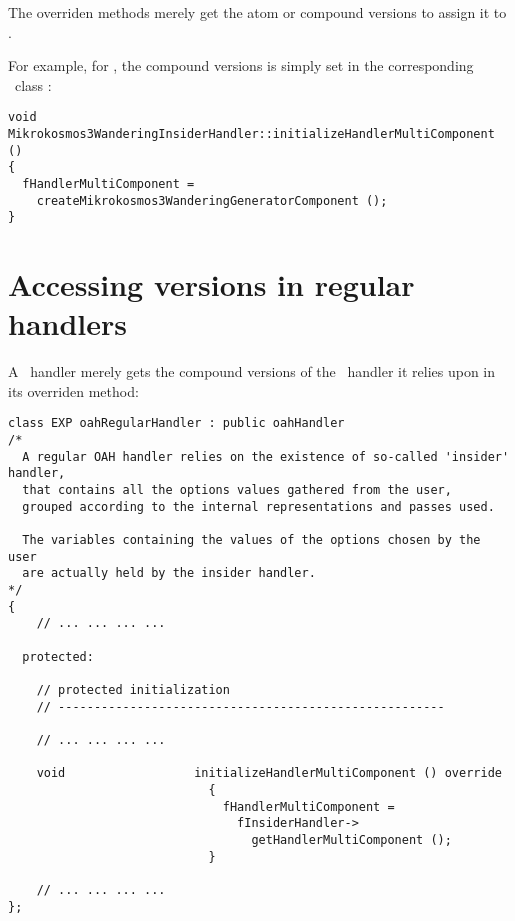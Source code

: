 The overriden  methods merely get the atom or compound versions to assign it to .

For example, for , the compound versions is simply set in the corresponding \insider\ class   :
\begin{lstlisting}[language=CPlusPlus]
void Mikrokosmos3WanderingInsiderHandler::initializeHandlerMultiComponent ()
{
  fHandlerMultiComponent =
    createMikrokosmos3WanderingGeneratorComponent ();
}
\end{lstlisting}


\section{Accessing versions in regular handlers}\label{Accessing versions in regular handlers}

A \regular\ handler merely gets the compound versions of the \insider\ handler it relies upon in its overriden  method:
\begin{lstlisting}[language=CPlusPlus]
class EXP oahRegularHandler : public oahHandler
/*
  A regular OAH handler relies on the existence of so-called 'insider' handler,
  that contains all the options values gathered from the user,
  grouped according to the internal representations and passes used.

  The variables containing the values of the options chosen by the user
  are actually held by the insider handler.
*/
{
	// ... ... ... ...

  protected:

    // protected initialization
    // ------------------------------------------------------

	// ... ... ... ...

    void                  initializeHandlerMultiComponent () override
                            {
                              fHandlerMultiComponent =
                                fInsiderHandler->
                                  getHandlerMultiComponent ();
                            }

	// ... ... ... ...
};
\end{lstlisting}


